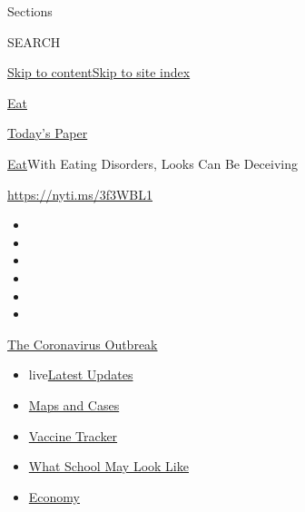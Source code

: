 Sections

SEARCH

\protect\hyperlink{site-content}{Skip to
content}\protect\hyperlink{site-index}{Skip to site index}

\href{https://www.nytimes3xbfgragh.onion/section/well/eat}{Eat}

\href{https://myaccount.nytimes3xbfgragh.onion/auth/login?response_type=cookie\&client_id=vi}{}

\href{https://www.nytimes3xbfgragh.onion/section/todayspaper}{Today's
Paper}

\href{/section/well/eat}{Eat}\textbar{}With Eating Disorders, Looks Can
Be Deceiving

\url{https://nyti.ms/3f3WBL1}

\begin{itemize}
\item
\item
\item
\item
\item
\item
\end{itemize}

\href{https://www.nytimes3xbfgragh.onion/news-event/coronavirus?action=click\&pgtype=Article\&state=default\&region=TOP_BANNER\&context=storylines_menu}{The
Coronavirus Outbreak}

\begin{itemize}
\tightlist
\item
  live\href{https://www.nytimes3xbfgragh.onion/2020/08/02/world/coronavirus-updates.html?action=click\&pgtype=Article\&state=default\&region=TOP_BANNER\&context=storylines_menu}{Latest
  Updates}
\item
  \href{https://www.nytimes3xbfgragh.onion/interactive/2020/us/coronavirus-us-cases.html?action=click\&pgtype=Article\&state=default\&region=TOP_BANNER\&context=storylines_menu}{Maps
  and Cases}
\item
  \href{https://www.nytimes3xbfgragh.onion/interactive/2020/science/coronavirus-vaccine-tracker.html?action=click\&pgtype=Article\&state=default\&region=TOP_BANNER\&context=storylines_menu}{Vaccine
  Tracker}
\item
  \href{https://www.nytimes3xbfgragh.onion/interactive/2020/07/29/us/schools-reopening-coronavirus.html?action=click\&pgtype=Article\&state=default\&region=TOP_BANNER\&context=storylines_menu}{What
  School May Look Like}
\item
  \href{https://www.nytimes3xbfgragh.onion/live/2020/07/31/business/stock-market-today-coronavirus?action=click\&pgtype=Article\&state=default\&region=TOP_BANNER\&context=storylines_menu}{Economy}
\end{itemize}

